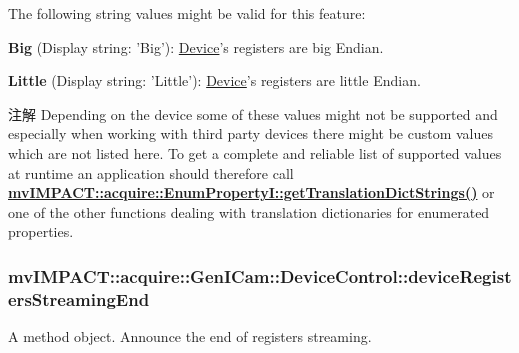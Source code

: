 The following string values might be valid for this feature\+:
\begin{DoxyItemize}
\item {\bfseries Big} (Display string\+: 'Big')\+: \hyperlink{classmv_i_m_p_a_c_t_1_1acquire_1_1_device}{Device}'s registers are big Endian.
\item {\bfseries Little} (Display string\+: 'Little')\+: \hyperlink{classmv_i_m_p_a_c_t_1_1acquire_1_1_device}{Device}'s registers are little Endian.
\end{DoxyItemize}

\begin{DoxyNote}{注解}
Depending on the device some of these values might not be supported and especially when working with third party devices there might be custom values which are not listed here. To get a complete and reliable list of supported values at runtime an application should therefore call {\bfseries \hyperlink{classmv_i_m_p_a_c_t_1_1acquire_1_1_enum_property_i_a0ba6ccbf5ee69784d5d0b537924d26b6}{mv\+I\+M\+P\+A\+C\+T\+::acquire\+::\+Enum\+Property\+I\+::get\+Translation\+Dict\+Strings()}} or one of the other functions dealing with translation dictionaries for enumerated properties. 
\end{DoxyNote}
\hypertarget{classmv_i_m_p_a_c_t_1_1acquire_1_1_gen_i_cam_1_1_device_control_ae36496c8712f92e9ebd582d80299e466}{
\subsubsection[{device\+Registers\+Streaming\+End}]{ mv\+I\+M\+P\+A\+C\+T\+::acquire\+::\+Gen\+I\+Cam\+::\+Device\+Control\+::device\+Registers\+Streaming\+End}}\label{classmv_i_m_p_a_c_t_1_1acquire_1_1_gen_i_cam_1_1_device_control_ae36496c8712f92e9ebd582d80299e466}


A method object. Announce the end of registers streaming. 

